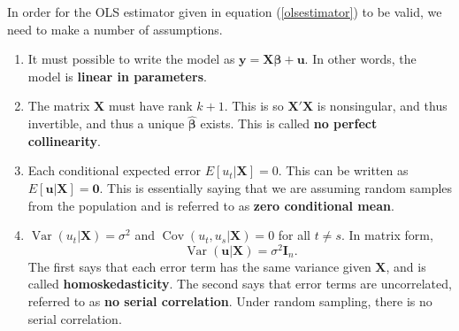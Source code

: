 \documentclass[12pt]{article}
\renewcommand{\vec}[1]{\mathbf{#1}}
\renewcommand{\hat}[1]{\widehat{#1}}
\DeclareMathOperator*{\Var}{Var}
\DeclareMathOperator*{\Cov}{Cov}
\theoremstyle{definition}
\begin{document}
In order for the OLS estimator given in equation (\ref{olsestimator}) to be valid, we need to make a number of assumptions. 
\begin{enumerate}
	\item It must possible to write the model as $\vec{y}=\vec{X\bm{\beta} + u}$. In other words, the model is \textbf{linear in parameters}. 
	\item The matrix $\vec{X}$ must have rank $k+1$. This is so $\vec{X'X}$ is nonsingular, and thus invertible, and thus a unique $\hat{\bm{\beta}}$ exists. This is called \textbf{no perfect collinearity}. 
	\item Each conditional expected error $E[u_t | \vec{X}]=0$. This can be written as $E[\vec{u | X}]=\vec{0}$. This is essentially saying that we are assuming random samples from the population and is referred to as \textbf{zero conditional mean}. 
	\item  $\Var(u_t | \vec{X}) = \sigma^2$ and $\Cov(u_t,u_s|\vec{X})=0$ for all $t \neq s$. In matrix form,
		\[	\Var(\vec{u} | \vec{X}) = \sigma^2 \vec{I}_n.\]	
	The first says that each error term has the same variance given $\vec{X}$, and is called \textbf{homoskedasticity}. The second says that error terms are uncorrelated, referred to as \textbf{no serial correlation}. Under random sampling, there is no serial correlation.  
\end{enumerate}
\end{document}

